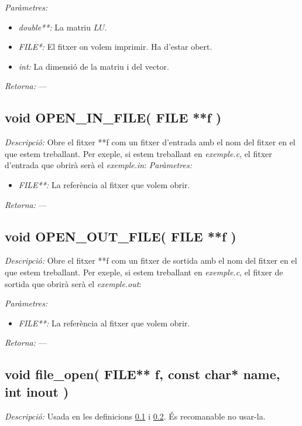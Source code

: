 \documentclass[a4paper,10pt, notitlepage]{article}
\begin{document}
\textit{Paràmetres: }\begin{itemize}[label={--}]
  \item \textit{double**: } La matriu $LU$.
  \item \textit{FILE*: } El fitxer on volem imprimir. Ha d'estar obert.
  \item \textit{int: } La dimensió de la matriu i del vector.
\end{itemize}
\textit{Retorna: } ---



\subsection{void OPEN\_IN\_FILE( FILE **f )}
\label{subsec:openinfile}
\textit{Descripció: }
  Obre el fitxer **f com un fitxer d'entrada amb el nom del fitxer en el que estem treballant. Per exeple, si estem treballant en \textit{exemple.c}, el fitxer d'entrada que obrirà serà el \textit{exemple.in}:
\textit{Paràmetres: }\begin{itemize}[label={--}]
   \item \textit{FILE**: } La referència al fitxer que volem obrir.
\end{itemize}
\textit{Retorna: } ---



\subsection{void OPEN\_OUT\_FILE( FILE **f )}
\label{subsec:openoutfile}
\textit{Descripció: }
  Obre el fitxer **f com un fitxer de sortida amb el nom del fitxer en el que estem treballant. Per exeple, si estem treballant en \textit{exemple.c}, el fitxer de sortida que obrirà serà el \textit{exemple.out}:

\textit{Paràmetres: }\begin{itemize}[label={--}]
   \item\textit{FILE**: } La referència al fitxer que volem obrir.
\end{itemize}
\textit{Retorna: } ---



\subsection{void file\_open( FILE** f, const char* name, int inout )}
\textit{Descripció: }
  Usada en les definicions \ref{subsec:openinfile} i \ref{subsec:openoutfile}. És recomanable no usar-la.
\end{document}

